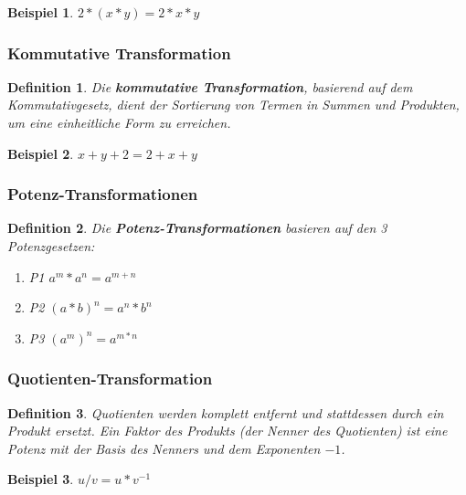 \documentclass[11pt]{article}
\newtheorem{defin}{Definition}
\newtheorem{example}{Beispiel}
\begin{document}
\begin{example} \normalfont
  $2*(x*y) = 2*x*y$
\end{example}

\subsubsection{Kommutative Transformation}

\begin{defin}
  \label{def:kommutative_transformation}
  Die \textbf{kommutative Transformation}, 
  basierend auf dem Kommutativgesetz, dient der Sortierung von Termen in Summen und Produkten, 
  um eine einheitliche Form zu erreichen.
\end{defin}

\begin{example} \normalfont
  $x+y+2 = 2+x+y$
\end{example}

\subsubsection{Potenz-Transformationen}

\begin{defin}
  \label{def:potenz_transformation}
  Die \textbf{Potenz-Transformationen} basieren auf den 3 Potenzgesetzen:
  \begin{enumerate}
    \item P1 $a^m * a^n = a^{m+n}$
    \item P2 $(a*b)^n   = a^n * b^n$
    \item P3 $(a^m)^n   = a^{m*n}$
  \end{enumerate}
\end{defin}

\subsubsection{Quotienten-Transformation}

\begin{defin}
  \label{def:quotienten-transformation}
  Quotienten werden komplett entfernt und stattdessen durch ein Produkt ersetzt. 
  Ein Faktor des Produkts (der Nenner des Quotienten) ist eine Potenz mit der Basis des Nenners und dem Exponenten $-1$.
\end{defin}

\begin{example} \normalfont
  $u/v = u * v^{-1}$
\end{example}
\end{document}
